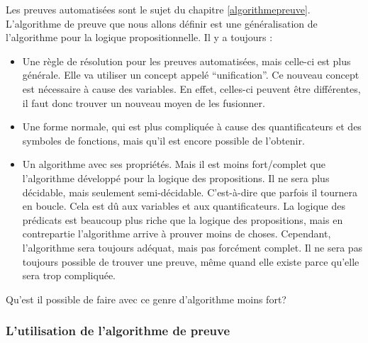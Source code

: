 Les preuves automatisées sont le sujet du chapitre \ref{algorithmepreuve}.
L'algorithme de preuve que nous allons définir est une généralisation de l'algorithme pour la logique propositionnelle.
Il y a toujours :
\begin{itemize}
  \item Une règle de résolution pour les preuves automatisées, mais celle-ci est plus générale. Elle va utiliser un concept appelé
``unification''. Ce nouveau concept est nécessaire à cause des variables.
En effet, celles-ci peuvent être différentes, il faut donc trouver un nouveau moyen de les fusionner.
  \item Une forme normale, qui  est plus compliquée à cause des quantificateurs et des symboles de fonctions, mais qu'il est encore possible de l'obtenir.
  \item Un algorithme avec ses propriétés. Mais il est moins fort/complet que l'algorithme développé pour la logique des propositions. Il ne sera plus décidable, mais seulement semi-décidable. C'est-à-dire que parfois il tournera en boucle. Cela est dû aux variables et aux quantificateurs. La logique des prédicats est beaucoup plus riche que la logique des propositions, mais en contrepartie l'algorithme arrive à prouver moins de choses. Cependant, l'algorithme sera toujours adéquat, mais pas forcément complet. Il ne sera pas toujours possible de trouver une preuve, même quand elle existe parce qu'elle sera trop compliquée.
\end{itemize}
Qu'est il possible de faire avec ce genre d'algorithme moins fort?

\subsubsection{L'utilisation de l'algorithme de preuve}

